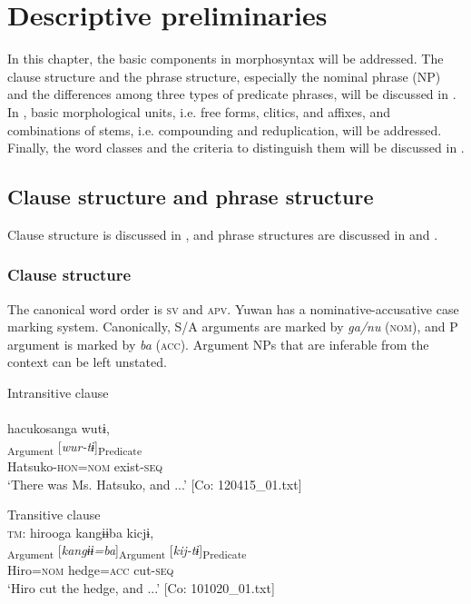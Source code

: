 \chapter{Descriptive preliminaries}\label{chap:4}

In this chapter, the basic components in morphosyntax will be addressed. The clause structure and the phrase structure, especially the nominal phrase (NP) and the differences among three types of predicate phrases, will be discussed in . In , basic morphological units, i.e. free forms, clitics, and affixes, and combinations of stems, i.e. compounding and reduplication, will be addressed. Finally, the word classes and the criteria to distinguish them will be discussed in .

\section{Clause structure and phrase structure}\label{sec:4.1}

Clause structure is discussed in , and phrase structures are discussed in  and .

\subsection{Clause structure}\label{sec:4.1.1}

The canonical word order is \textsc{sv} and \textsc{apv}. Yuwan has a nominative-accusative case marking system. Canonically, S/A arguments are marked by \textit{ga/nu} (\textsc{nom}), and P argument is marked by \textit{ba} (\textsc{acc}). Argument NPs that are inferable from the context can be left unstated.

\ea\label{ex:4.1}
\ea  Intransitive clause\\\label{ex:4.1a}\\
    \glll    hacukosanga  wutɨ,\\
      [\textit{hacuko-san=ga}]\textsubscript{Argument}  [\textit{wur-tɨ}]\textsubscript{Predicate}\\
      Hatsuko-\textsc{hon}=\textsc{nom}  exist-\textsc{seq}\\
      \glt       ‘There was Ms. Hatsuko, and ...’ [Co: 120415\_01.txt]

\ex Transitive clause\\\label{ex:4.1b}
\glll    \textsc{tm}:  hirooga  kangɨɨba  kicjɨ,\\
      [\textit{hiroo=ga}]\textsubscript{Argument}  [\textit{kangɨɨ=ba}]\textsubscript{Argument}  [\textit{kij-tɨ}]\textsubscript{Predicate}\\
      Hiro=\textsc{nom}  hedge=\textsc{acc}  cut-\textsc{seq}\\
      \glt       ‘Hiro cut the hedge, and ...’ [Co: 101020\_01.txt]
    \z
\z

